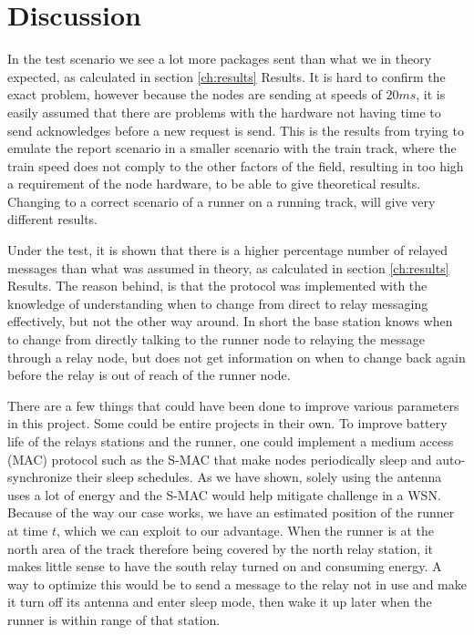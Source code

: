 \section{Discussion}
\noindent In the test scenario we see a lot more packages sent than what we in theory expected, as calculated in section \ref{ch:results} Results. It is hard to confirm the exact problem, however because the nodes are sending at speeds of $20ms$, it is easily assumed that there are problems with the hardware not having time to send acknowledges before a new request is send. This is the results from trying to emulate the report scenario in a smaller scenario with the train track, where the train speed does not comply to the other factors of the field, resulting in too high a requirement of the node hardware, to be able to give theoretical results. Changing to a correct scenario of a runner on a running track, will give very different results.

\noindent Under the test, it is shown that there is a higher percentage number of relayed messages than what was assumed in theory, as calculated in section \ref{ch:results} Results. The reason behind, is that the protocol was implemented with the knowledge of understanding when to change from direct to relay messaging effectively, but not the other way around. In short the base station knows when to change from directly talking to the runner node to relaying the message through a relay node, but does not get information on when to change back again before the relay is out of reach of the runner node. 

\noindent There are a few things that could have been done to improve various parameters in this project. Some could be entire projects in their own. To improve battery life of the relays stations and the runner, one could implement a medium access (MAC) protocol such as the S-MAC that make nodes periodically sleep and auto-synchronize their sleep schedules. As we have shown, solely using the antenna uses a lot of energy and the S-MAC would help mitigate challenge in a WSN. Because of the way our case works, we have an estimated position of the runner at time $t$, which we can exploit to our advantage. When the runner is at the north area of the track therefore being covered by the north relay station, it makes little sense to have the south relay turned on and consuming energy. A way to optimize this would be to send a message to the relay not in use and make it turn off its antenna and enter sleep mode, then wake it up later when the runner is within range of that station.


